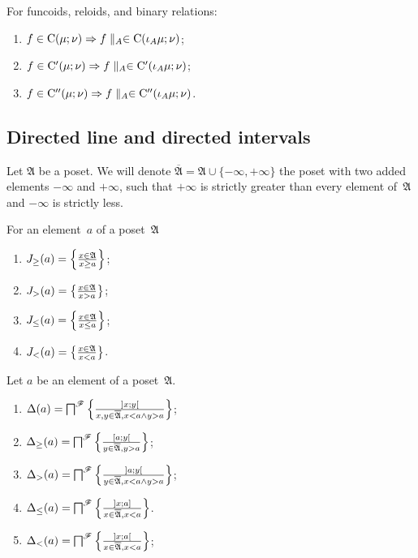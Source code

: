 \begin{prop}
For funcoids, reloids, and binary relations:
\begin{enumerate}
\item $f\in\mathrm{C}(\mu;\nu)\Rightarrow f\parallel_{A}\in\mathrm{C}(\iota_A\mu;\nu)$;
\item $f\in\mathrm{C}'(\mu;\nu)\Rightarrow f\parallel_{A}\in\mathrm{C}'(\iota_A\mu;\nu)$;
\item $f\in\mathrm{C}''(\mu;\nu)\Rightarrow f\parallel_{A}\in\mathrm{C}''(\iota_A\mu;\nu)$. 
\end{enumerate}
\end{prop}

\subsection{Directed line and directed intervals}


Let $\mathfrak{A}$ be a poset. We will denote $\overline{\mathfrak{A}}=\mathfrak{A}\cup\{-\infty,+\infty\}$ the poset
with two added elements $-\infty$ and $+\infty$, such that $+\infty$ is strictly greater than every element of~$\mathfrak{A}$
and $-\infty$ is strictly less.

\begin{defn}
For an element~$a$ of a poset~$\mathfrak{A}$
\begin{enumerate}
\item $J_{\geq}(a) = \left\{ \frac{x\in\mathfrak{A}}{x\geq a}\right\}$;
\item $J_{>}(a) = \left\{ \frac{x\in\mathfrak{A}}{x>a}\right\}$;
\item $J_{\leq}(a) = \left\{ \frac{x\in\mathfrak{A}}{x\leq a}\right\}$;
\item $J_{<}(a) = \left\{ \frac{x\in\mathfrak{A}}{x<a}\right\}$.
\end{enumerate}
\end{defn}

\begin{defn}
Let $a$ be an element of a poset~$\mathfrak{A}$.
\begin{enumerate}
\item $\Delta(a) = \bigsqcap^{\mathscr{F}} \left\{ \frac{]x;y[}{x,y\in\overline{\mathfrak{A}}, x<a\land y>a}\right\}$;
\item $\Delta_{\geq}(a) = \bigsqcap^{\mathscr{F}} \left\{ \frac{[a;y[}{y\in\overline{\mathfrak{A}}, y>a}\right\}$;
\item $\Delta_{>}(a) = \bigsqcap^{\mathscr{F}} \left\{ \frac{]a;y[}{y\in\overline{\mathfrak{A}}, x<a\land y>a}\right\}$;
\item $\Delta_{\leq}(a) = \bigsqcap^{\mathscr{F}} \left\{ \frac{]x;a]}{x\in\overline{\mathfrak{A}}, x<a}\right\}$.
\item $\Delta_{<}(a) = \bigsqcap^{\mathscr{F}} \left\{ \frac{]x;a[}{x\in\overline{\mathfrak{A}}, x<a}\right\}$;
\end{enumerate}
\end{defn}


